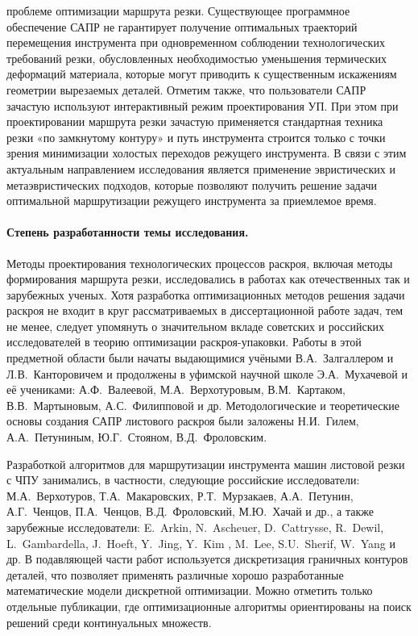 проблеме оптимизации маршрута резки. 
Существующее программное обеспечение САПР не гарантирует 
получение оптимальных траекторий перемещения инструмента 
при одновременном соблюдении технологических требований резки, 
обусловленных необходимостью уменьшения термических деформаций материала, 
которые могут приводить к существенным искажениям геометрии вырезаемых деталей. 
Отметим также, что пользователи САПР зачастую используют интерактивный режим проектирования УП. 
При этом при проектировании маршрута резки зачастую применяется 
стандартная техника резки «по замкнутому контуру» и путь инструмента строится 
только с точки зрения минимизации холостых переходов режущего инструмента.
В связи с этим актуальным направлением
исследования является применение эвристических и метаэвристических подходов,
которые позволяют получить решение задачи
оптимальной маршрутизации
режущего инструмента
за приемлемое время.

\paragraph*{Степень разработанности темы исследования.}

Методы проектирования технологических процессов раскроя, 
включая методы формирования маршрута резки, исследовались в работах как отечественных так и зарубежных ученых. 
Хотя разработка оптимизационных методов решения задачи раскроя не входит в круг рассматриваемых в диссертационной работе задач, 
тем не менее, следует упомянуть о значительном вкладе советских и российских исследователей 
в теорию оптимизации раскроя-упаковки. 
Работы в этой предметной области были начаты выдающимися учёными 
В.А.~Залгаллером и Л.В.~Канторовичем  
и продолжены в уфимской научной школе 
Э.А.~Мухачевой и её учениками: 
А.Ф.~Валеевой, М.А.~Верхотуровым, В.М.~Картаком, В.В.~Мартыновым, А.С.~Филипповой и др. 
Методологические и теоретические основы создания САПР листового раскроя были заложены 
Н.И.~Гилем, А.А.~Петуниным, Ю.Г.~Стояном, В.Д.~Фроловским.

Разработкой алгоритмов для маршрутизации инструмента машин листовой резки с ЧПУ занимались, 
в частности, следующие российские исследователи: 
М.А.~Верхотуров, Т.А.~Макаровских, Р.Т.~Мурзакаев, А.А.~Петунин, А.Г.~Ченцов,
П.А.~Ченцов, В.Д.~Фроловский, М.Ю.~Хачай и др., 
а также зарубежные исследователи: 
E.~Arkin, N.~Ascheuer, D.~Cattrysse, R.~Dewil, L.~Gambardella, J.~Hoeft, Y.~Jing, Y.~Kim , M.~Lee, S.U.~Sherif, W.~Yang и др.
В подавляющей части работ
используется дискретизация граничных контуров деталей, 
что позволяет применять различные хорошо разработанные математические модели дискретной оптимизации. 
Можно отметить только отдельные публикации, 
где оптимизационные алгоритмы ориентированы на поиск решений среди континуальных множеств.

